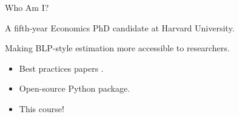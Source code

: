 \documentclass[aspectratio=169,t,11pt,table]{beamer}
\begin{document}




\begin{frame}{Who Am I?}
    \begin{wideitemize}
        \item A fifth-year Economics PhD candidate at Harvard University.
        \pause
        \item Making BLP-style estimation more accessible to researchers.
        \begin{itemize}
            \item Best practices papers \citep{conlon2020best,conlon2023incorporating}.
            \item Open-source Python package.
            \item This course!
        \end{itemize}
    \end{wideitemize}
\end{frame}
\end{document}
